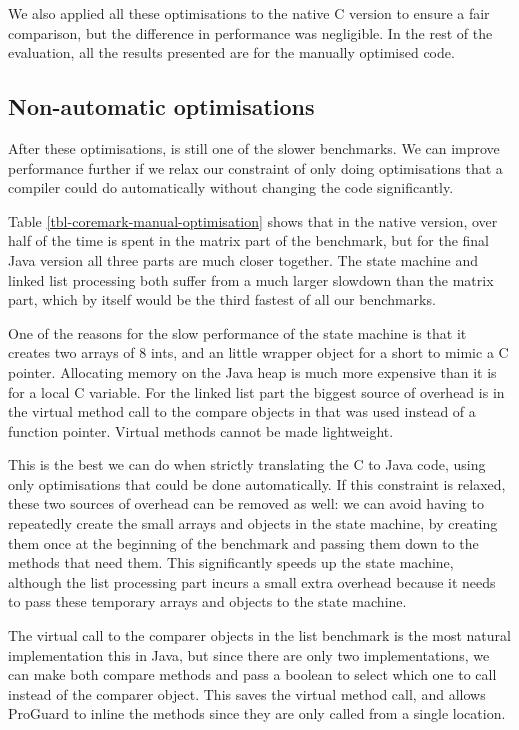 We also applied all these optimisations to the native C version to ensure a fair comparison, but the difference in performance was negligible. In the rest of the evaluation, all the results presented are for the manually optimised code.

\subsection{Non-automatic optimisations}
\label{sec-evaluation-coremark-non-automatic-optimisations}
After these optimisations,  is still one of the slower benchmarks. We can improve performance further if we relax our constraint of only doing optimisations that a compiler could do automatically without changing the code significantly.

Table \ref{tbl-coremark-manual-optimisation} shows that in the native version, over half of the time is spent in the matrix part of the benchmark, but for the final Java version all three parts are much closer together. The state machine and linked list processing both suffer from a much larger slowdown than the matrix part, which by itself would be the third fastest of all our benchmarks.

One of the reasons for the slow performance of the state machine is that it creates two arrays of 8 ints, and an little wrapper object for a short to mimic a C pointer. Allocating memory on the Java heap is much more expensive than it is for a local C variable. For the linked list part the biggest source of overhead is in the virtual method call to the compare objects in  that was used instead of a function pointer. Virtual methods cannot be made lightweight.

This is the best we can do when strictly translating the C to Java code, using only optimisations that could be done automatically. If this constraint is relaxed, these two sources of overhead can be removed as well: we can avoid having to repeatedly create the small arrays and objects in the state machine, by creating them once at the beginning of the benchmark and passing them down to the methods that need them. This significantly speeds up the state machine, although the list processing part incurs a small extra overhead because it needs to pass these temporary arrays and objects to the state machine.

The virtual call to the comparer objects in the list benchmark is the most natural implementation this in Java, but since there are only two implementations, we can make both compare methods  and pass a boolean to select which one to call instead of the comparer object. This saves the virtual method call, and allows ProGuard to inline the methods since they are only called from a single location.

